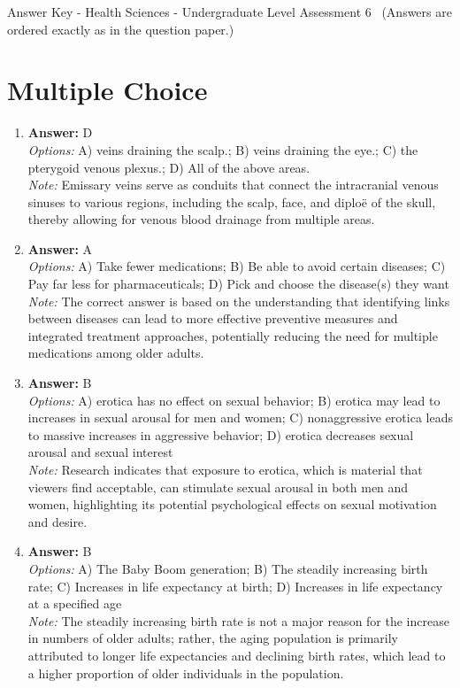 \documentclass[12pt]{article}
\begin{document}
\begin{center}
Answer Key - Health Sciences - Undergraduate Level Assessment 6 \
\small (Answers are ordered exactly as in the question paper.)
\end{center}

\section*{Multiple Choice}
\begin{enumerate}[label=\arabic*.]
\item \textbf{Answer:} D
\\ \textit{Options:} A) veins draining the scalp.; B) veins draining the eye.; C) the pterygoid venous plexus.; D) All of the above areas.
\\ \textit{Note:} Emissary veins serve as conduits that connect the intracranial venous sinuses to various regions, including the scalp, face, and diploë of the skull, thereby allowing for venous blood drainage from multiple areas.
\item \textbf{Answer:} A
\\ \textit{Options:} A) Take fewer medications; B) Be able to avoid certain diseases; C) Pay far less for pharmaceuticals; D) Pick and choose the disease(s) they want
\\ \textit{Note:} The correct answer is based on the understanding that identifying links between diseases can lead to more effective preventive measures and integrated treatment approaches, potentially reducing the need for multiple medications among older adults.
\item \textbf{Answer:} B
\\ \textit{Options:} A) erotica has no effect on sexual behavior; B) erotica may lead to increases in sexual arousal for men and women; C) nonaggressive erotica leads to massive increases in aggressive behavior; D) erotica decreases sexual arousal and sexual interest
\\ \textit{Note:} Research indicates that exposure to erotica, which is material that viewers find acceptable, can stimulate sexual arousal in both men and women, highlighting its potential psychological effects on sexual motivation and desire.
\item \textbf{Answer:} B
\\ \textit{Options:} A) The Baby Boom generation; B) The steadily increasing birth rate; C) Increases in life expectancy at birth; D) Increases in life expectancy at a specified age
\\ \textit{Note:} The steadily increasing birth rate is not a major reason for the increase in numbers of older adults; rather, the aging population is primarily attributed to longer life expectancies and declining birth rates, which lead to a higher proportion of older individuals in the population.

\end{enumerate}
\end{document}
